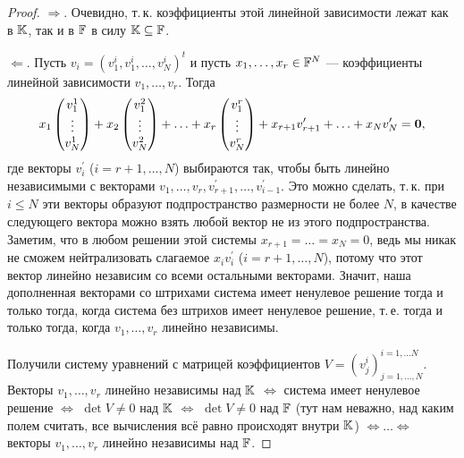 \begin{proof}
    $\Rightarrow$. Очевидно, т.\,к. коэффициенты этой линейной зависимости лежат как в $\mathbb{K}$, так и в $\mathbb{F}$ в силу $\mathbb{K} \subseteq \mathbb{F}$.

    $\Leftarrow$. Пусть $v_i = (v^i_1, v^i_1, \ldots, v^i_N)^t$ и пусть $x_1, \ldots, x_r \in \mathbb{F}^N$ --- коэффициенты линейной зависимости $v_1, \ldots, v_r$. Тогда
    \[
        x_1
        \begin{pmatrix}
            v^1_1\\
            \vdots\\
            v^1_N
        \end{pmatrix} +
        x_2
        \begin{pmatrix}
            v^2_1\\
            \vdots\\
            v^2_N
        \end{pmatrix} + \ldots +
        x_r
        \begin{pmatrix}
            v^r_1\\
            \vdots\\
            v^r_N
        \end{pmatrix} + x_{r + 1}v^\prime_{r + 1} + \ldots + x_Nv^\prime_N = \boldsymbol{0},
    \]
    где векторы $v^\prime_i$ ($i = r + 1, \ldots, N$) выбираются так, чтобы быть линейно независимыми с векторами $v_1, \ldots, v_r, v^\prime_{r + 1}, \ldots, v^\prime_{i - 1}$. Это можно сделать, т.\,к. при $i \leqslant N$ эти векторы образуют подпространство размерности не более $N$, в качестве следующего вектора можно взять любой вектор не из этого подпространства. Заметим, что в любом решении этой системы $x_{r + 1} = \ldots = x_N = 0$, ведь мы никак не сможем нейтрализовать слагаемое $x_iv^\prime_i$ ($i = r + 1, \ldots, N$), потому что этот вектор линейно независим со всеми остальными векторами. Значит, наша дополненная векторами со штрихами система имеет ненулевое решение тогда и только тогда, когда система без штрихов имеет ненулевое решение, т.\,е. тогда и только тогда, когда $v_1, \ldots, v_r$ линейно независимы.

    Получили систему уравнений с матрицей коэффициентов $V = (v^i_j)^{i = 1, \ldots N}_{j = 1, \ldots, N}$. Векторы $v_1, \ldots, v_r$ линейно независимы над $\mathbb{K}$ $\Leftrightarrow$ система имеет ненулевое решение $\Leftrightarrow$ $\det V \ne 0$ над $\mathbb{K}$ $\Leftrightarrow$ $\det V \ne 0$ над $\mathbb{F}$ (тут нам неважно, над каким полем считать, все вычисления всё равно происходят внутри $\mathbb{K}$) $\Leftrightarrow\ldots\Leftrightarrow$ векторы $v_1, \ldots, v_r$ линейно независимы над $\mathbb{F}$.
\end{proof}


